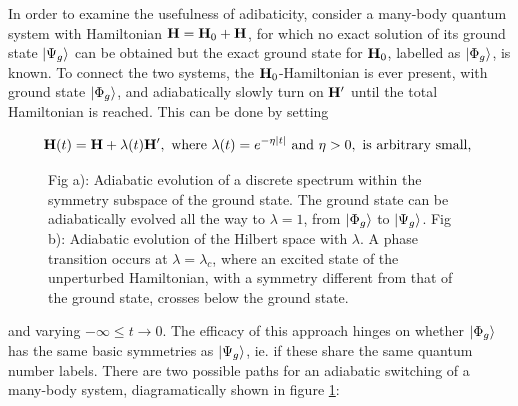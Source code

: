 \documentclass{homework}
\begin{document}
In order to examine the usefulness of adibaticity, consider a many-body quantum system with Hamiltonian ${\bf H} = {\bf H}_0 + {\bf H}$, for which no exact solution of its ground state $\ket{\Psi_g}$ can be obtained but the exact ground state for ${\bf H}_0$, labelled as $\ket{\Phi_g}$, is known. To connect the two systems, the ${\bf H}_0$-Hamiltonian is ever present, with ground state $\ket{\Phi_g}$, and adiabatically slowly turn on ${\bf H}'$ until the total Hamiltonian is reached. This can be done by setting 

\begin{equation}
    {\bf H}(t) = {\bf H} + \lambda(t) {\bf H}', \textnormal{ where } \lambda(t) = e^{-\eta |t|} \textnormal{ and } \eta > 0, \textnormal{ is arbitrary small, }
    \label{Adiabatic_switching_on}
\end{equation}

\begin{figure}
    \centering
    \qquad
    \caption{\small  Fig a): Adiabatic evolution of a discrete spectrum within the symmetry subspace of the ground state. The ground state can be adiabatically evolved all the way to $\lambda = 1$, from $\ket{\Phi_g}$ to $\ket{\Psi_g}$. Fig b): Adiabatic evolution of the Hilbert space with $\lambda$. A phase transition occurs at $\lambda = \lambda_c$, where an excited state of the unperturbed Hamiltonian, with a symmetry different from that of the ground state, crosses below the ground state. } 
    \label{figs:adiabatic_evols}
\end{figure}

and varying $-\infty \leq t \rightarrow 0$. The efficacy of this approach hinges on whether $\ket{\Phi_g}$ has the same basic symmetries as $\ket{\Psi_g}$, ie. if these share the same quantum number labels. There are two possible paths for an adiabatic switching of a many-body system, diagramatically shown in figure \cref{figs:adiabatic_evols}:
\end{document}
